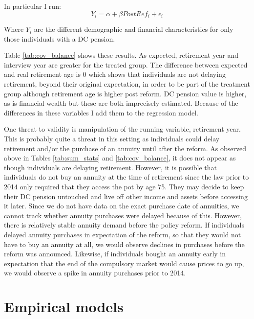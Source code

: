 \documentclass[12pt]{article}
\begin{document}
In particular I run:
\begin{equation*}
    Y_{i} = \alpha + \beta PostRef_{i}  + \epsilon_{i}
\end{equation*}

Where $Y_{i}$ are the different demographic and financial characteristics for
only those individuals with a DC pension.

\linespread{1}

\linespread{1.5}

Table \ref{tab:cov_balance} shows these results. As expected, retirement year
and interview year are greater for the treated group. The difference between
expected and real retirement age is 0 which shows that individuals are not
delaying retirement, beyond their original expectation,  in order to be part of
the treatment group although retirement age is higher post reform. DC pension
value is higher, as is financial wealth but these are both imprecisely
estimated. Because of the differences in these variables I add them to the
regression model.

One threat to validity is manipulation of the running variable, retirement year.
This is probably quite a threat in this setting as individuals could delay
retirement and/or the purchase of an annuity until after the reform. As observed
above in Tables \ref{tab:sum_stats} and \ref{tab:cov_balance}, it does not
appear as though individuals are delaying retirement. However, it is possible
that individuals do not buy an annuity at the time of retirement since the law
prior to 2014 only required that they access the pot by age 75. They may decide
to keep their DC pension untouched and live off other income and assets before
accessing it later. Since we do not have data on the exact purchase date of
annuities, we cannot track whether annuity purchases were delayed because of
this. However, there is relatively stable annuity demand before the policy
reform. If individuals delayed annuity purchases in expectation of the reform,
so that they would not have to buy an annuity at all, we would observe declines
in purchases before the reform was announced. Likewise, if individuals bought an
annuity early in expectation that the end of the compulsory market would cause
prices to go up, we would observe a spike in annuity purchases prior to 2014.


\section{Empirical models}
\end{document}
